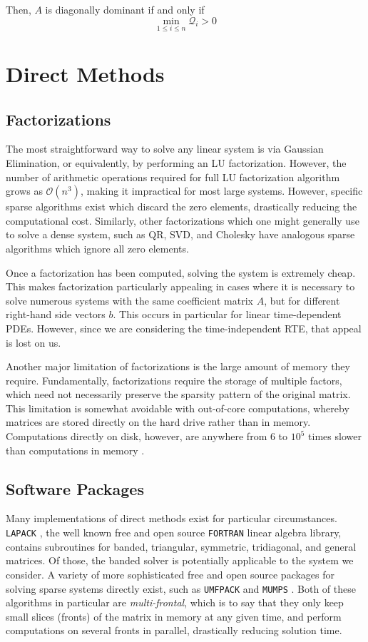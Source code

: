 \documentclass[10pt]{article}
\newcommand\QQ{\mathcal{Q}}
\begin{document}
\begin{multicols}{2}
Then, $A$ is diagonally dominant if and only if
\begin{equation}
	\min_{1\leq i \leq n} \QQ_i > 0
\end{equation}

\section{Direct Methods}
\subsection{Factorizations}
The most straightforward way to solve any linear system is via Gaussian Elimination, or equivalently, by performing an LU factorization.
However, the number of arithmetic operations required for full LU factorization algorithm grows as $\mathcal{O}(n^3)$, making it impractical for most large systems.
However, specific sparse algorithms exist which discard the zero elements, drastically reducing the computational cost.
Similarly, other factorizations which one might generally use to solve a dense system, such as QR, SVD, and Cholesky have analogous sparse algorithms which ignore all zero elements.

Once a factorization has been computed, solving the system is extremely cheap.
This makes factorization particularly appealing in cases where it is necessary to solve numerous systems with the same coefficient matrix $A$, but for different right-hand side vectors $b$.
This occurs in particular for linear time-dependent PDEs.
However, since we are considering the time-independent RTE, that appeal is lost on us.

Another major limitation of factorizations is the large amount of memory they require.
Fundamentally, factorizations require the storage of multiple factors, which need not necessarily preserve the sparsity pattern of the original matrix.
This limitation is somewhat avoidable with out-of-core computations, whereby matrices are stored directly on the hard drive rather than in memory.
Computations directly on disk, however, are anywhere from 6 to $10^5$ times slower than computations in memory \citep{jacobs_pathologies_2009}.

\subsection{Software Packages}
Many implementations of direct methods exist for particular circumstances.
\texttt{LAPACK} \citep{anderson_lapack_1999}, the well known free and open source \texttt{FORTRAN} linear algebra library, contains subroutines for banded, triangular, symmetric, tridiagonal, and general matrices.
Of those, the banded solver is potentially applicable to the system we consider.
A variety of more sophisticated free and open source packages for solving sparse systems directly exist, such as \texttt{UMFPACK} \citep{davis_algorithm_2004} and \texttt{MUMPS} \citep{amestoy_mumps:_2001}.
Both of these algorithms in particular are \textit{multi-frontal}, which is to say that they only keep small slices (fronts) of the matrix in memory at any given time, and perform computations on several fronts in parallel, drastically reducing solution time.


\end{multicols}
\end{document}
